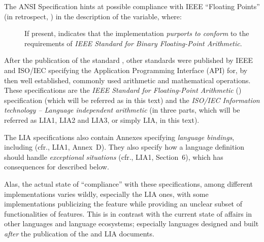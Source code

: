 \documentclass[../../CDR-IEEE-754-support.tex]{subfiles}
\begin{document}
The ANSI \CL{} Specification \cite{1996:ANSIHyperSpec} hints at possible
compliance with IEEE ``Floating Points'' (in retrospect, \IEEEFPStd{}) in
the description of the  variable, where:
\begin{description}
\item[]
  If present, indicates that the
  implementation \emph{purports to conform}  to the requirements of
  \emph{IEEE Standard for Binary Floating-Point Arithmetic}. 
\end{description}

After the publication of the \CL{} standard \cite{1994:ANSICL}, other
standards were published by IEEE and ISO/IEC specifying the
Application Programming Interface (API) for, by then well established,
commonly used arithmetic and mathematical operations.  These
specifications are the \emph{IEEE Standard for Floating-Point
  Arithmetic} (\IEEEFPStd{}) \cite{2008:IEEE-754} specification (which
will be referred as \IEEEFPStd{} in this text) and the \emph{ISO/IEC
  Information technology -- Language independent arithmetic} \IECLIA{}
\cite{2012:LIA1,2001:LIA2,2004:LIA3} (in three parts, which will be
referred as LIA1, LIA2 and LIA3, or simply LIA, in this text).

\vspace*{3mm}

\noindent
The LIA specifications also contain Annexes specifying \emph{language
  bindings}, including \CL{} (cfr., LIA1, Annex~D).  They also specify
how a language definition should handle \emph{exceptional situations}
(cfr., LIA1, Section~6), which has consequences for \CL{} described
below.

\vspace*{3mm}

\noindent
Alas, the actual state of ``compliance'' with these specifications,
among different \CL{} implementations varies wildly, especially the
LIA ones, with some implementations publicizing the
 feature while providing an unclear subset
of functionalities of features.
This is in contrast with the current state of affairs in other
languages and language ecosystems; especially languages designed and
built \emph{after} the publication of the \IEEEFPStd{} and LIA
documents.

\vspace*{3mm}
\end{document}
